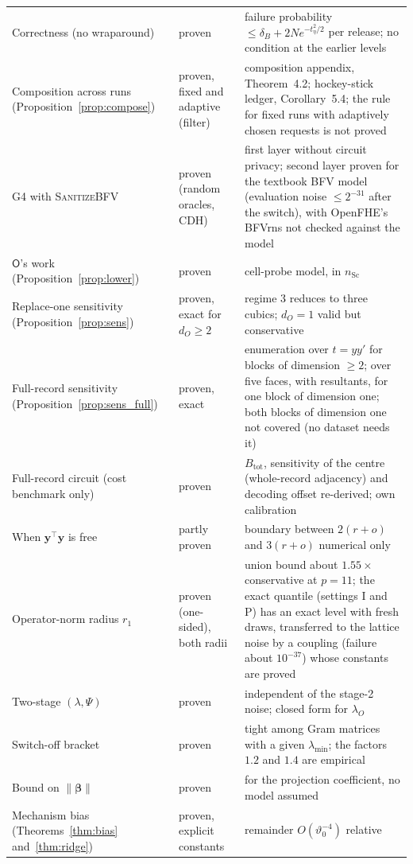 \documentclass[11pt]{article}
\theoremstyle{definition}
\theoremstyle{plain}
\newcommand{\by}{\mathbf{y}}
\newcommand{\bbeta}{\boldsymbol{\beta}}
\newcommand{\Party}[1]{\textsf{#1}}
\newcommand{\Op}{\Party{O}}
\begin{document}
{\begin{xltabular}{\textwidth}{@{}>{\raggedright\arraybackslash}p{4.4cm}>{\raggedright\arraybackslash}p{2.6cm}>{\raggedright\arraybackslash}X@{}}
Correctness (no wraparound) & proven & failure probability $\le \delta_B + 2Ne^{-t_\eta^2/2}$ per release; no condition at the earlier levels \\
Composition across runs (Proposition~\ref{prop:compose}) & proven, fixed and adaptive (filter) & composition appendix, Theorem~4.2; hockey-stick ledger, Corollary~5.4; the rule for fixed runs with adaptively chosen requests is not proved \\
G4 with \textsc{SanitizeBFV} & proven (random oracles, CDH) & first layer without circuit privacy; second layer proven for the textbook BFV model (evaluation noise $\le 2^{-31}$ after the switch), with OpenFHE's BFVrns not checked against the model \\
$\Op$'s work (Proposition~\ref{prop:lower}) & proven & cell-probe model, in $n_{\mathrm{Sc}}$ \\
Replace-one sensitivity (Proposition~\ref{prop:sens}) & proven, exact for $d_O \ge 2$ & regime 3 reduces to three cubics; $d_O = 1$ valid but conservative \\
Full-record sensitivity (Proposition~\ref{prop:sens_full}) & proven, exact & enumeration over $t = yy'$ for blocks of dimension $\ge 2$; over five faces, with resultants, for one block of dimension one; both blocks of dimension one not covered (no dataset needs it) \\
Full-record circuit (cost benchmark only) & proven & $B_{\mathrm{tot}}$, sensitivity of the centre (whole-record adjacency) and decoding offset re-derived; own calibration \\
When $\by^\top\by$ is free & partly proven & boundary between $2(r + o)$ and $3(r + o)$ numerical only \\
Operator-norm radius $r_1$ & proven (one-sided), both radii & union bound about $1.55\times$ conservative at $p = 11$; the exact quantile (settings I and P) has an exact level with fresh draws, transferred to the lattice noise by a coupling (failure about $10^{-37}$) whose constants are proved \\
Two-stage $(\lambda, \Psi)$ & proven & independent of the stage-2 noise; closed form for $\lambda_O$ \\
Switch-off bracket & proven & tight among Gram matrices with a given $\lambda_{\min}$; the factors $1.2$ and $1.4$ are empirical \\
Bound on $\|\bbeta\|$ & proven & for the projection coefficient, no model assumed \\
Mechanism bias (Theorems~\ref{thm:bias} and~\ref{thm:ridge}) & proven, explicit constants & remainder $O(\vartheta_0^{-4})$ relative \\

\end{xltabular}}
\end{document}
